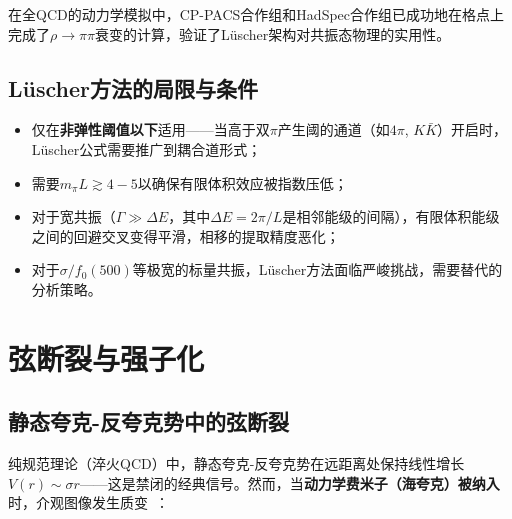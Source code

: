 \documentclass[12pt,a4paper]{ctexart}
\theoremstyle{definition}
\begin{document}
在全QCD的动力学模拟中，CP-PACS合作组和HadSpec合作组已成功地在格点上完成了$\rho\to\pi\pi$衰变的计算，验证了L\"uscher架构对共振态物理的实用性。

\subsection{L\"uscher方法的局限与条件}

\begin{itemize}[nosep]
    \item 仅在\textbf{非弹性阈值以下}适用——当高于双$\pi$产生阈的通道（如$4\pi$, $K\bar K$）开启时，L\"uscher公式需要推广到耦合道形式；
    \item 需要$m_\pi L \gtrsim 4-5$以确保有限体积效应被指数压低；
    \item 对于宽共振（$\Gamma \gg \Delta E$，其中$\Delta E = 2\pi/L$是相邻能级的间隔），有限体积能级之间的回避交叉变得平滑，相移的提取精度恶化；
    \item 对于$\sigma/f_0(500)$等极宽的标量共振，L\"uscher方法面临严峻挑战，需要替代的分析策略。
\end{itemize}

\section{弦断裂与强子化}

\subsection{静态夸克-反夸克势中的弦断裂}

纯规范理论（淬火QCD）中，静态夸克-反夸克势在远距离处保持线性增长$V(r) \sim \sigma r$——这是禁闭的经典信号。然而，当\textbf{动力学费米子（海夸克）被纳入}时，介观图像发生质变~\cite{GattringerLang2010}：

\begin{center}
\end{center}
\end{document}
